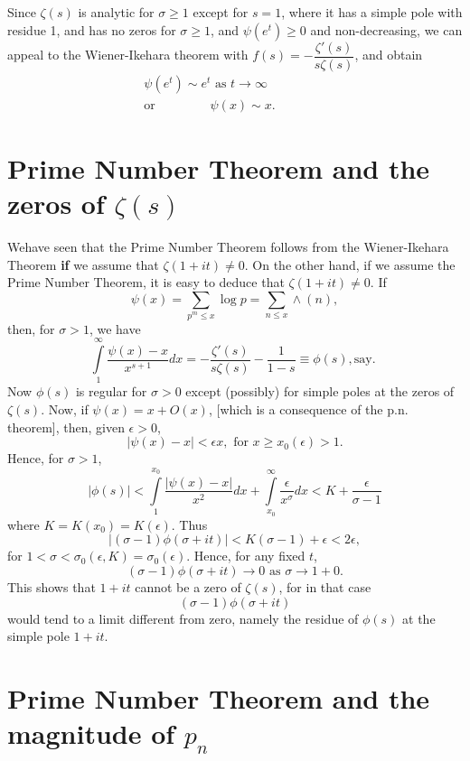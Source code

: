 Since $\zeta(s)$ is analytic for $\sigma \geq 1$ except for $s=1$,
where it has a simple pole with residue 1, and has no zeros for
$\sigma \geq 1$, and $\psi(e^t) \geq 0$ and non-decreasing, we can
appeal to the Wiener-Ikehara theorem with $f(s) = -
\dfrac{\zeta'(s)}{s\zeta(s)}$, and obtain
\begin{gather*} 
\psi(e^t) \sim e^t \text{ as } t \to \infty\\
\text{or } \qquad \qquad \psi (x) \sim x. \qquad \qquad 
\end{gather*}

\section[Prime Number Theorem and the zeros of  $\zeta(s)$]{Prime Number Theorem and the zeros of  {\boldmath$\zeta(s)$}}\label{chap17:sec13}

We\pageoriginale have seen that the Prime Number Theorem follows from the
Wiener-Ikehara Theorem {\bf if} we assume that $\zeta(1+it)\neq 0$. On the
other hand, if we assume the Prime Number Theorem, it is easy to
deduce that $\zeta(1+it) \neq 0$. If
$$
\psi(x) = \sum\limits_{p^m \leq x} \log p = \sum\limits_{n \leq x}
\wedge (n),
$$
then, for $\sigma >1$, we have
$$
\int\limits^\infty_1 \frac{\psi(x) -x}{x^{s+1}} dx = -
\frac{\zeta'(s)}{s\zeta(s)} -\frac{1}{1-s} \equiv \phi (s),  \text{
  say. }
$$
Now $\phi(s)$ is regular for $\sigma >0$ except (possibly) for simple
poles at the zeros of $\zeta(s)$. Now, if $\psi(x) = x + O(x)$, [which
is a consequence of the p.n. theorem], then, given $\epsilon >0$,
$$
|\psi (x) - x| < \epsilon x, \text{ for } x \geq x_0 (\epsilon)
> 1. 
$$
Hence, for $\sigma >1$,
$$
|\phi(s)| < \int\limits^{x_0}_1 \frac{|\psi(x)-x |}{x^2} dx+
\int\limits^\infty_{x_0 }  \frac{\epsilon}{x^\sigma} dx < K +
\frac{\epsilon}{\sigma-1} 
$$
where $K = K (x_0) = K(\epsilon)$. Thus
$$
|(\sigma -1) \phi (\sigma + i t)| < K(\sigma -1) + \epsilon < 2
\epsilon, 
$$
for $1<\sigma < \sigma_0 (\epsilon , K) =
\sigma_0(\epsilon)$. Hence, for any fixed $t$, 
$$
(\sigma -1) \phi (\sigma + it) \to 0 \text{ as } \sigma \to 1 + 0. 
$$
This shows that $1+it$ cannot be a zero of $\zeta(s)$, for in that
case
$$
(\sigma -1) \phi (\sigma + it)
$$
would tend to a limit different from zero, namely the residue of
$\phi(s)$ at the simple pole $1+it$.

\section[Prime Number Theorem and the magnitude of
  $p_n$]{Prime Number Theorem and the magnitude of
  {\boldmath$p_n$}}\label{chap17:sec14}

